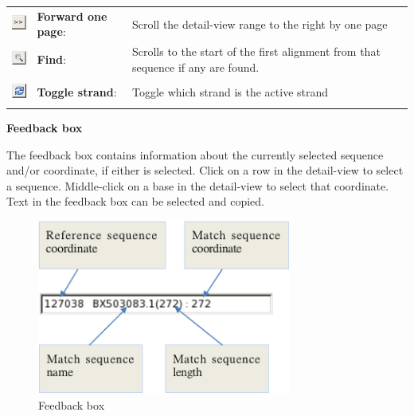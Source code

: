 \documentclass[letterpaper]{article}
\begin{document}
\begin{center}
\begin{supertabular}{b{1.5cm}p{4.373cm}p{8.967cm}}
\includegraphics[width=0.693cm,height=0.693cm]{img_button_forward_page.png} &
\textbf{Forward one}\textbf{\textit{
}}\textbf{page}: &
Scroll the detail-view range to the right by
one page\\
 
\includegraphics[width=0.693cm,height=0.693cm]{img_button_find.png} &
\textbf{Find}: &
Scrolls to the start of the first alignment
from that sequence if any are found.\\
 
\includegraphics[width=0.693cm,height=0.751cm]{img_button_toggle_strand.png} &
\textbf{Toggle strand}: &
Toggle which strand is the active strand\\
\end{supertabular}
\end{center}


\bigskip

{\bfseries Feedback box }

{The feedback box contains information about the currently selected
sequence and/or coordinate, if either is selected. Click on a row in
the detail-view to select a sequence. Middle-click on a base in the
detail-view to select that coordinate. Text in the feedback box can
be selected and copied.}

\begin{figure}
\centering
\color[rgb]{0.30980393,0.5058824,0.7411765}
\includegraphics[width=8.359cm,height=5.75cm]{img_view_feedback_box.png}
\caption{Feedback box}
\end{figure}
\end{document}
